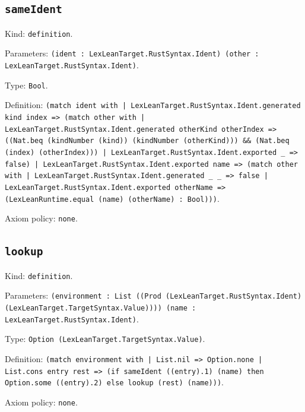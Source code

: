 \documentclass[11pt]{article}
\begin{document}
\subsection*{\texttt{sameIdent}}
\noindent Kind: \texttt{definition}.\par
\noindent Parameters: \texttt{(ident : LexLeanTarget.RustSyntax.Ident) (other : LexLeanTarget.RustSyntax.Ident)}.\par
\noindent Type: \texttt{Bool}.\par
\noindent Definition: \texttt{(match ident with | LexLeanTarget.RustSyntax.Ident.generated kind index => (match other with | LexLeanTarget.RustSyntax.Ident.generated otherKind otherIndex => ((Nat.beq (kindNumber (kind)) (kindNumber (otherKind))) \&\& (Nat.beq (index) (otherIndex))) | LexLeanTarget.RustSyntax.Ident.exported \_ => false) | LexLeanTarget.RustSyntax.Ident.exported name => (match other with | LexLeanTarget.RustSyntax.Ident.generated \_ \_ => false | LexLeanTarget.RustSyntax.Ident.exported otherName => (LexLeanRuntime.equal (name) (otherName) : Bool)))}.\par
\noindent Axiom policy: \texttt{none}.\par
\subsection*{\texttt{lookup}}
\noindent Kind: \texttt{definition}.\par
\noindent Parameters: \texttt{(environment : List ((Prod (LexLeanTarget.RustSyntax.Ident) (LexLeanTarget.TargetSyntax.Value)))) (name : LexLeanTarget.RustSyntax.Ident)}.\par
\noindent Type: \texttt{Option (LexLeanTarget.TargetSyntax.Value)}.\par
\noindent Definition: \texttt{(match environment with | List.nil => Option.none | List.cons entry rest => (if sameIdent ((entry).1) (name) then Option.some ((entry).2) else lookup (rest) (name)))}.\par
\noindent Axiom policy: \texttt{none}.\par
\end{document}
